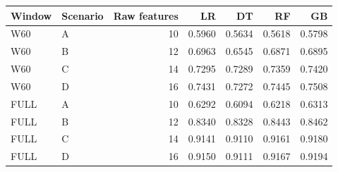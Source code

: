 \small
\setlength{\tabcolsep}{4pt}
\begin{tabular}{@{}llrrrrr@{}}
\toprule
Window & Scenario & Raw features & LR & DT & RF & GB \\
\midrule
W60 & A & 10 & 0.5960 & 0.5634 & 0.5618 & 0.5798 \\
W60 & B & 12 & 0.6963 & 0.6545 & 0.6871 & 0.6895 \\
W60 & C & 14 & 0.7295 & 0.7289 & 0.7359 & 0.7420 \\
W60 & D & 16 & 0.7431 & 0.7272 & 0.7445 & 0.7508 \\
FULL & A & 10 & 0.6292 & 0.6094 & 0.6218 & 0.6313 \\
FULL & B & 12 & 0.8340 & 0.8328 & 0.8443 & 0.8462 \\
FULL & C & 14 & 0.9141 & 0.9110 & 0.9161 & 0.9180 \\
FULL & D & 16 & 0.9150 & 0.9111 & 0.9167 & 0.9194 \\
\bottomrule
\end{tabular}
